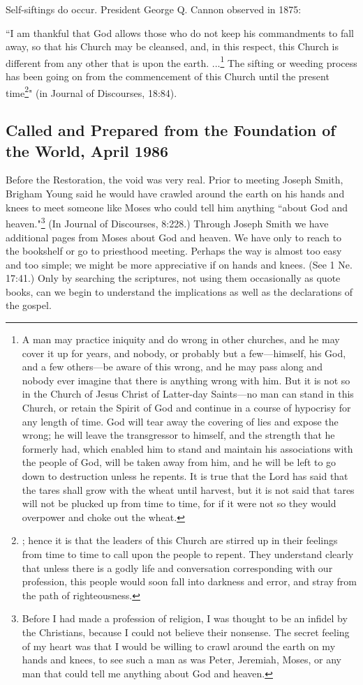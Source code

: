 Self-siftings do occur. President George Q. Cannon observed in 1875:

``I am thankful that God allows those who do not keep his commandments to fall away, so that his Church may be cleansed, and, in this respect, this Church is different from any other that is upon the earth. ...\footnote{A man may practice iniquity and do wrong in other churches, and he may cover it up for years, and nobody, or probably but a few—himself, his God, and a few others—be aware of this wrong, and he may pass along and nobody ever imagine that there is anything wrong with him. But it is not so in the Church of Jesus Christ of Latter-day Saints—no man can stand in this Church, or retain the Spirit of God and continue in a course of hypocrisy for any length of time. God will tear away the covering of lies and expose the wrong; he will leave the transgressor to himself, and the strength that he formerly had, which enabled him to stand and maintain his associations with the people of God, will be taken away from him, and he will be left to go down to destruction unless he repents. It is true that the Lord has said that the tares shall grow with the wheat until harvest, but it is not said that tares will not be plucked up from time to time, for if it were not so they would overpower and choke out the wheat.} The sifting or weeding process has been going on from the commencement of this Church until the present time\footnote{; hence it is that the leaders of this Church are stirred up in their feelings from time to time to call upon the people to repent. They understand clearly that unless there is a godly life and conversation corresponding with our profession, this people would soon fall into darkness and error, and stray from the path of righteousness.}" (in Journal of Discourses, 18:84).

\subsection{Called and Prepared from the Foundation of the World, April 1986}

Before the Restoration, the void was very real. Prior to meeting Joseph Smith, Brigham Young said he would have crawled around the earth on his hands and knees to meet someone like Moses who could tell him anything ``about God and heaven."\footnote{Before I had made a profession of religion, I was thought to be an infidel by the Christians, because I could not believe their nonsense. The secret feeling of my heart was that I would be willing to crawl around the earth on my hands and knees, to see such a man as was Peter, Jeremiah, Moses, or any man that could tell me anything about God and heaven.} (In Journal of Discourses, 8:228.) Through Joseph Smith we have additional pages from Moses about God and heaven. We have only to reach to the bookshelf or go to priesthood meeting. Perhaps the way is almost too easy and too simple; we might be more appreciative if on hands and knees. (See 1 Ne. 17:41.) Only by searching the scriptures, not using them occasionally as quote books, can we begin to understand the implications as well as the declarations of the gospel.

